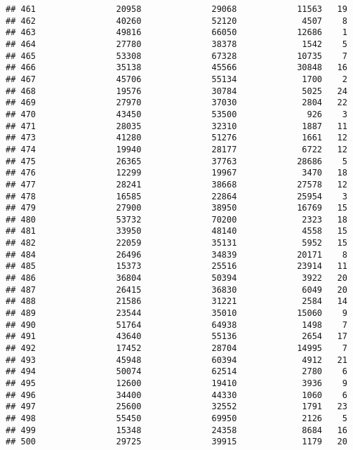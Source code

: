 \documentclass[
]{article}
\begin{document}
\begin{verbatim}
## 461                20958              29068            11563   19
## 462                40260              52120             4507    8
## 463                49816              66050            12686    1
## 464                27780              38378             1542    5
## 465                53308              67328            10735    7
## 466                35138              45566            30848   16
## 467                45706              55134             1700    2
## 468                19576              30784             5025   24
## 469                27970              37030             2804   22
## 470                43450              53500              926    3
## 471                28035              32310             1887   11
## 473                41280              51276             1661   12
## 474                19940              28177             6722   12
## 475                26365              37763            28686    5
## 476                12299              19967             3470   18
## 477                28241              38668            27578   12
## 478                16585              22864            25954    3
## 479                27900              38950            16769   15
## 480                53732              70200             2323   18
## 481                33950              48140             4558   15
## 482                22059              35131             5952   15
## 484                26496              34839            20171    8
## 485                15373              25516            23914   11
## 486                36804              50394             3922   20
## 487                26415              36830             6049   20
## 488                21586              31221             2584   14
## 489                23544              35010            15060    9
## 490                51764              64938             1498    7
## 491                43640              55136             2654   17
## 492                17452              28704            14995    7
## 493                45948              60394             4912   21
## 494                50074              62514             2780    6
## 495                12600              19410             3936    9
## 496                34400              44330             1060    6
## 497                25600              32552             1791   23
## 498                55450              69950             2126    5
## 499                15348              24358             8684   16
## 500                29725              39915             1179   20

\end{verbatim}
\end{document}
